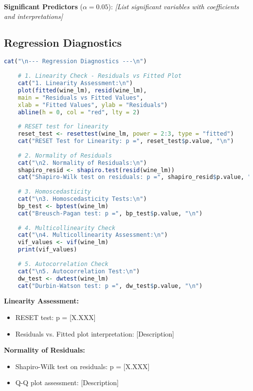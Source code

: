 \textbf{Significant Predictors} ($\alpha = 0.05$):
\textit{[List significant variables with coefficients and interpretations]}

\subsection{Regression Diagnostics}

\begin{lstlisting}[language=R, caption=Regression Diagnostics]
	cat("\n--- Regression Diagnostics ---\n")
	
	# 1. Linearity Check - Residuals vs Fitted Plot
	cat("1. Linearity Assessment:\n")
	plot(fitted(wine_lm), resid(wine_lm),
	main = "Residuals vs Fitted Values",
	xlab = "Fitted Values", ylab = "Residuals")
	abline(h = 0, col = "red", lty = 2)
	
	# RESET test for linearity
	reset_test <- resettest(wine_lm, power = 2:3, type = "fitted")
	cat("RESET Test for Linearity: p =", reset_test$p.value, "\n")
	
	# 2. Normality of Residuals
	cat("\n2. Normality of Residuals:\n")
	shapiro_resid <- shapiro.test(resid(wine_lm))
	cat("Shapiro-Wilk test on residuals: p =", shapiro_resid$p.value, "\n")
	
	# 3. Homoscedasticity
	cat("\n3. Homoscedasticity Tests:\n")
	bp_test <- bptest(wine_lm)
	cat("Breusch-Pagan test: p =", bp_test$p.value, "\n")
	
	# 4. Multicollinearity Check
	cat("\n4. Multicollinearity Assessment:\n")
	vif_values <- vif(wine_lm)
	print(vif_values)
	
	# 5. Autocorrelation Check
	cat("\n5. Autocorrelation Test:\n")
	dw_test <- dwtest(wine_lm)
	cat("Durbin-Watson test: p =", dw_test$p.value, "\n")
\end{lstlisting}

\textbf{Linearity Assessment:}
\begin{itemize}
	\item RESET test: p = [X.XXX]
	\item Residuals vs. Fitted plot interpretation: [Description]
\end{itemize}

\textbf{Normality of Residuals:}
\begin{itemize}
	\item Shapiro-Wilk test on residuals: p = [X.XXX]
	\item Q-Q plot assessment: [Description]
\end{itemize}


